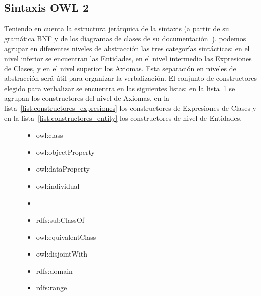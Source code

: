 \subsection{Sintaxis OWL 2}
\label{sec:gen_doc_sintaxis_owl}
Teniendo en cuenta la estructura jerárquica de la sintaxis (a partir de su gramática BNF y de los diagramas de clases de su documentación~\cite{OWL2W3C}), podemos agrupar en diferentes niveles de abstracción las tres categorías sintácticas: en el nivel inferior se encuentran las Entidades, en el nivel intermedio las Expresiones de Clases, y en el nivel superior los Axiomas. Esta separación en niveles de abstracción será útil para organizar la verbalización. El conjunto de constructores elegido para verbalizar se encuentra en las siguientes listas: en la lista~\ref{list:constructores_axiomas} se agrupan los constructores del nivel de Axiomas, en la lista~\ref{list:constructores_expresiones} los constructores de Expresiones de Clases y en la lista~\ref{list:constructores_entity} los constructores de nivel de Entidades.
\begin{figure}
\begin{multicols}{2}
\label{list:constructores_entity}
    \begin{itemize}
        \item owl:class
        \item owl:objectProperty
        \item owl:dataProperty
        \item owl:individual
        \item[\vspace{\fill}]
    \end{itemize}

\label{list:constructores_axiomas}
    \begin{itemize}
        \item rdfs:subClassOf
        \item owl:equivalentClass
        \item owl:disjointWith
        \item rdfs:domain
        \item rdfs:range
    \end{itemize}
    \end{multicols}
\end{figure}


